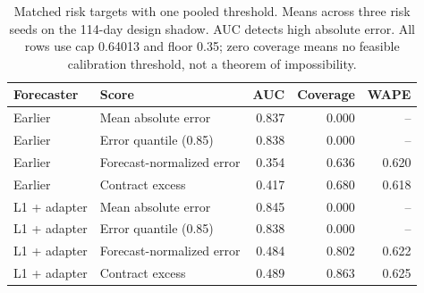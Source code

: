 \begin{table}[t]
\centering\small
\caption{Matched risk targets with one pooled threshold. Means across three risk seeds on the 114-day design shadow. AUC detects high absolute error. All rows use cap 0.64013 and floor 0.35; zero coverage means no feasible calibration threshold, not a theorem of impossibility.}
\label{tab:selectors}
\begin{tabular}{llrrr}
\toprule
Forecaster & Score & AUC & Coverage & WAPE\\
\midrule
Earlier & Mean absolute error & 0.837 & 0.000 & --\\
Earlier & Error quantile (0.85) & 0.838 & 0.000 & --\\
Earlier & Forecast-normalized error & 0.354 & 0.636 & 0.620\\
Earlier & Contract excess & 0.417 & 0.680 & 0.618\\
L1 + adapter & Mean absolute error & 0.845 & 0.000 & --\\
L1 + adapter & Error quantile (0.85) & 0.838 & 0.000 & --\\
L1 + adapter & Forecast-normalized error & 0.484 & 0.802 & 0.622\\
L1 + adapter & Contract excess & 0.489 & 0.863 & 0.625\\
\bottomrule
\end{tabular}
\end{table}
